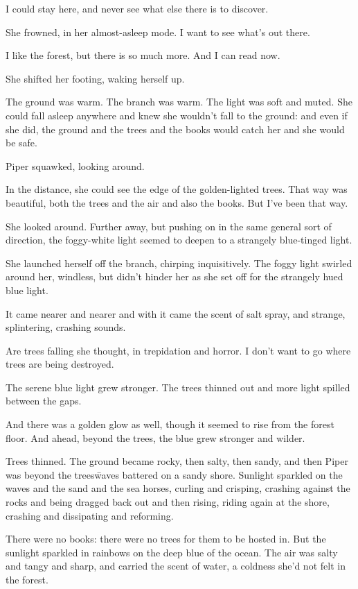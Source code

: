 I could stay here, and never see what else there is to discover.

She frowned, in her almost-asleep mode. I want to see what's out there.

I like the forest, but there is so much more. And I can read now.

She shifted her footing, waking herself up.

The ground was warm. The branch was warm. The light was soft and
muted. She could fall asleep anywhere and knew she wouldn't fall to
the ground: and even if she did, the ground and the trees and the
books would catch her and she would be safe.

Piper squawked, looking around.

In the distance, she could see the edge of the golden-lighted
trees. That way was beautiful, both the trees and the air and also the
books. But I've been that way.

She looked around. Further away, but pushing on in the same general
sort of direction, the foggy-white light seemed to deepen to a
strangely blue-tinged light.

She launched herself off the branch, chirping inquisitively. The foggy
light swirled around her, windless, but didn't hinder her as she set
off for the strangely hued blue light.

It came nearer and nearer and with it came the scent of salt spray,
and strange, splintering, crashing sounds.

Are trees falling she thought, in trepidation and horror. I don't want
to go where trees are being destroyed.

The serene blue light grew stronger. The trees thinned out and more
light spilled between the gaps.

And there was a golden glow as well, though it seemed to rise from the
forest floor. And ahead, beyond the trees, the blue grew stronger and
wilder.

Trees thinned. The ground became rocky, then salty, then sandy, and
then Piper was beyond the trees\=waves battered on a sandy
shore. Sunlight sparkled on the waves and the sand and the sea horses,
curling and crisping, crashing against the rocks and being dragged
back out and then rising, riding again at the shore, crashing and
dissipating and reforming.

There were no books: there were no trees for them to be hosted in. But
the sunlight sparkled in rainbows on the deep blue of the ocean. The
air was salty and tangy and sharp, and carried the scent of water, a
coldness she'd not felt in the forest.

